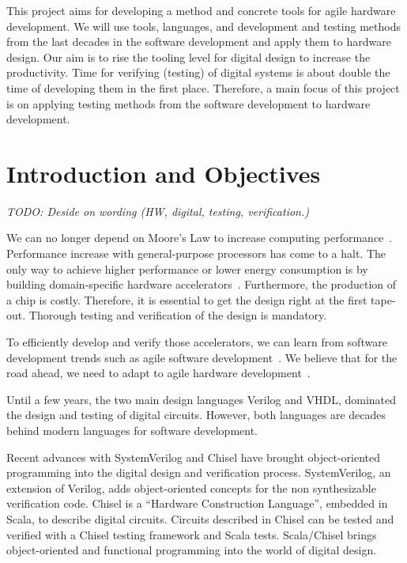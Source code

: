\documentclass[fleqn,12pt]{article}
\newcommand{\todo}[1]{{\it TODO: #1}}
\begin{document}
This project aims for developing a method and concrete tools for agile hardware development. We will use tools, languages, and development and testing methods from the last decades in the software development and apply them to hardware design. Our aim is to rise the tooling level for digital design to increase the productivity. Time for verifying (testing) of digital systems is about double the time of developing them in the first place. Therefore, a main focus of this project is on applying testing methods from the software development to hardware development.

\section{Introduction and Objectives}
\label{sec:objectives}

\todo{Deside on wording (HW, digital, testing, verification.)}


We can no longer depend on Moore's Law to increase computing performance~\cite{dark-silicon:2011}.
Performance increase with general-purpose processors has come to a halt.
The only way to achieve higher performance or lower energy consumption
is by building domain-specific hardware accelerators~\cite{domain-hw-acc:2020}.
Furthermore, the production of a chip is costly. Therefore, it is essential to get the design right at the first tape-out. Thorough testing and verification of the design is mandatory.

To efficiently develop and verify those accelerators, we can learn from software development trends such as agile software development~\cite{agile:manifesto}.
We believe that for the road ahead, we need to adapt to agile hardware development~\cite{henn-patt:turing:2019}.

Until a few years, the two main design languages Verilog and VHDL, dominated the
design and testing of digital circuits. However, both languages are decades behind
modern languages for software development.

Recent advances with SystemVerilog and Chisel \cite{chisel:dac2012, chisel:book} have brought object-oriented programming
into the digital design and verification process. SystemVerilog, an extension of Verilog, adds object-oriented concepts for the non synthesizable verification code.
Chisel is a ``Hardware Construction Language'', embedded in Scala, to describe digital circuits.
Circuits described in Chisel can be tested and verified with a Chisel testing framework and Scala tests.
Scala/Chisel brings object-oriented and functional programming into the world of
digital design.
\end{document}
